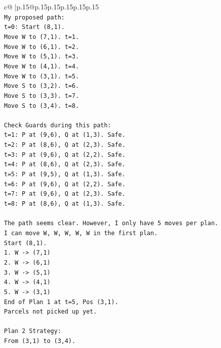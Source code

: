 \documentclass{article}
\begin{document}
{\begin{supertabular}{c@{$\;$}|p{.15\linewidth}@{}p{.15\linewidth}p{.15\linewidth}p{.15\linewidth}p{.15\linewidth}p{.15\linewidth}}
{{{\\ 
\texttt{My proposed path:} \\
\texttt{t=0: Start (8,1).} \\
\texttt{Move W to (7,1). t=1.} \\
\texttt{Move W to (6,1). t=2.} \\
\texttt{Move W to (5,1). t=3.} \\
\texttt{Move W to (4,1). t=4.} \\
\texttt{Move W to (3,1). t=5.} \\
\texttt{Move S to (3,2). t=6.} \\
\texttt{Move S to (3,3). t=7.} \\
\texttt{Move S to (3,4). t=8.} \\
\\ 
\texttt{Check Guards during this path:} \\
\texttt{t=1: P at (9,6), Q at (1,3). Safe.} \\
\texttt{t=2: P at (8,6), Q at (2,3). Safe.} \\
\texttt{t=3: P at (9,6), Q at (2,2). Safe.} \\
\texttt{t=4: P at (8,6), Q at (2,3). Safe.} \\
\texttt{t=5: P at (9,5), Q at (1,3). Safe.} \\
\texttt{t=6: P at (9,6), Q at (2,2). Safe.} \\
\texttt{t=7: P at (9,6), Q at (2,3). Safe.} \\
\texttt{t=8: P at (8,6), Q at (1,3). Safe.} \\
\\ 
\texttt{The path seems clear. However, I only have 5 moves per plan.} \\
\texttt{I can move W, W, W, W, W in the first plan.} \\
\texttt{Start (8,1).} \\
\texttt{1. W {-}> (7,1)} \\
\texttt{2. W {-}> (6,1)} \\
\texttt{3. W {-}> (5,1)} \\
\texttt{4. W {-}> (4,1)} \\
\texttt{5. W {-}> (3,1)} \\
\texttt{End of Plan 1 at t=5, Pos (3,1).} \\
\texttt{Parcels not picked up yet.} \\
\\ 
\texttt{Plan 2 Strategy:} \\
\texttt{From (3,1) to (3,4).} \\
}}}
\end{supertabular}}
\end{document}

